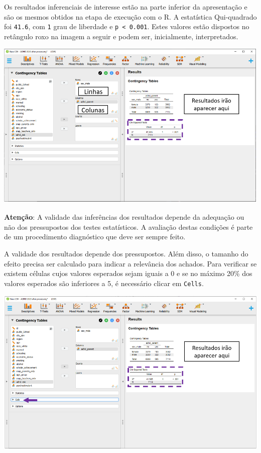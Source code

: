 \documentclass[
]{book}
\begin{document}
Os resultados inferenciais de interesse estão na parte inferior da apresentação e são os mesmos obtidos na etapa de execução com o R. A estatística Qui-quadrado foi \texttt{41.6}, com \texttt{1} grau de liberdade e \texttt{p\ \textless{}\ 0.001}. Estes valores estão dispostos no retângulo roxo na imagem a seguir e podem ser, inicialmente, interpretados.

\includegraphics{./img/cap_x2_resultados2.png}

\textbf{Atenção}: A validade das inferências dos resultados depende da adequação ou não dos pressupostos dos testes estatísticos. A avaliação destas condições é parte de um procedimento diagnóstico que deve ser sempre feito.

A validade dos resultados depende dos pressupostos. Além disso, o tamanho do efeito precisa ser calculado para indicar a relevância dos achados. Para verificar se existem células cujos valores esperados sejam iguais a 0 e se no máximo 20\% dos valores esperados são inferiores a 5, é necessário clicar em \texttt{Cells}.

\includegraphics{./img/cap_x2_pressupostos.png}
\end{document}
